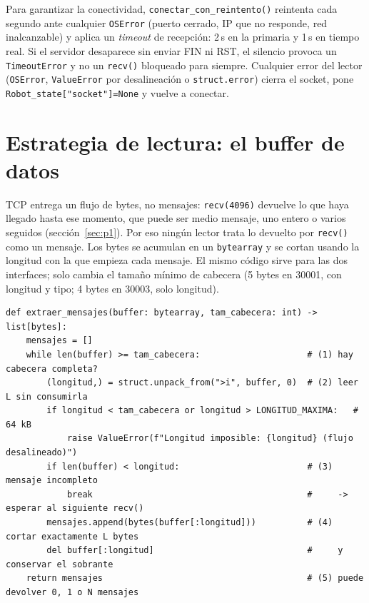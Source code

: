 \documentclass[10pt,a4paper]{article}
\newcommand{\code}[1]{\texttt{\small #1}}
\begin{document}
\vspace{-4pt}

Para garantizar la conectividad, \code{conectar\_con\_reintento()} reintenta cada segundo ante cualquier \code{OSError} (puerto cerrado, IP que no responde, red inalcanzable) y aplica un \emph{timeout} de recepción: 2\,s en la primaria y 1\,s en tiempo real. Si el servidor desaparece sin enviar FIN ni RST, el silencio provoca un \code{TimeoutError} y no un \code{recv()} bloqueado para siempre. Cualquier error del lector (\code{OSError}, \code{ValueError} por desalineación o \code{struct.error}) cierra el socket, pone \code{Robot\_state["socket"]=None} y vuelve a conectar. 

\section{Estrategia de lectura: el buffer de datos}

TCP entrega un flujo de bytes, no mensajes: \code{recv(4096)} devuelve lo que haya llegado hasta ese momento, que puede ser medio mensaje, uno entero o varios seguidos (sección~\ref{sec:p1}). Por eso ningún lector trata lo devuelto por \code{recv()} como un mensaje. Los bytes se acumulan en un \code{bytearray} y se cortan usando la longitud con la que empieza cada mensaje. El mismo código sirve para las dos interfaces; solo cambia el tamaño mínimo de cabecera (5 bytes en 30001, con longitud y tipo; 4 bytes en 30003, solo longitud).

\noindent\begin{minipage}{\linewidth}
\begin{lstlisting}[numbers=none,title={\scriptsize\color{grisT}\texttt{src/buffer\_ur.py}, líneas 25--37}]
def extraer_mensajes(buffer: bytearray, tam_cabecera: int) -> list[bytes]:
    mensajes = []
    while len(buffer) >= tam_cabecera:                     # (1) hay cabecera completa?
        (longitud,) = struct.unpack_from(">i", buffer, 0)  # (2) leer L sin consumirla
        if longitud < tam_cabecera or longitud > LONGITUD_MAXIMA:   # 64 kB
            raise ValueError(f"Longitud imposible: {longitud} (flujo desalineado)")
        if len(buffer) < longitud:                         # (3) mensaje incompleto
            break                                          #     -> esperar al siguiente recv()
        mensajes.append(bytes(buffer[:longitud]))          # (4) cortar exactamente L bytes
        del buffer[:longitud]                              #     y conservar el sobrante
    return mensajes                                        # (5) puede devolver 0, 1 o N mensajes
\end{lstlisting}
\end{minipage}
\end{document}

